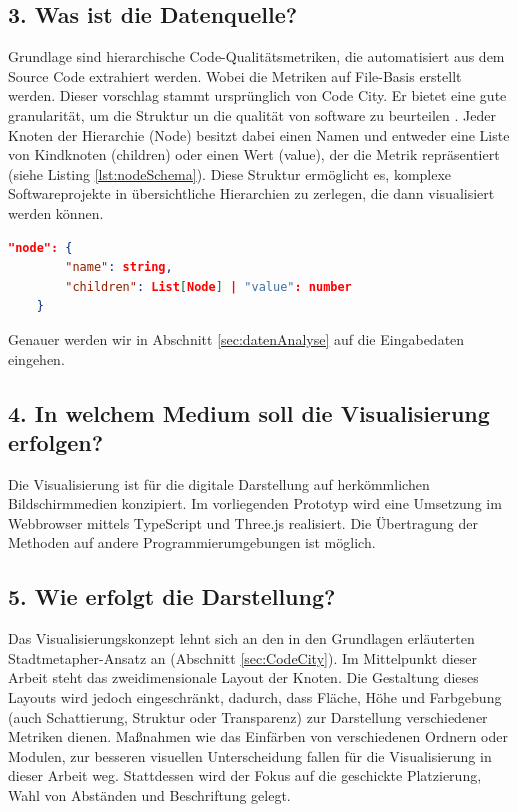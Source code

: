 \subsection*{3. Was ist die Datenquelle?}
Grundlage sind hierarchische Code-Qualitätsmetriken, die automatisiert aus dem Source Code extrahiert werden. Wobei die Metriken auf File-Basis erstellt werden. Dieser vorschlag stammt ursprünglich von Code City. Er bietet eine gute granularität, um die Struktur un die qualität von software zu beurteilen \cite{codeCity1}. Jeder Knoten der Hierarchie (Node) besitzt dabei einen Namen und entweder eine Liste von Kindknoten (children) oder einen Wert (value), der die Metrik repräsentiert (siehe Listing \ref{lst:nodeSchema}). 
Diese Struktur ermöglicht es, komplexe Softwareprojekte in übersichtliche Hierarchien zu zerlegen, die dann visualisiert werden können.

\begin{lstlisting}[language=json, caption={Schema einer Node}, label={lst:nodeSchema}]
    "node": {
        "name": string,
        "children": List[Node] | "value": number
    }
\end{lstlisting}

Genauer werden wir in Abschnitt \ref{sec:datenAnalyse} auf die Eingabedaten eingehen.

\subsection*{4. In welchem Medium soll die Visualisierung erfolgen?}
Die Visualisierung ist für die digitale Darstellung auf herkömmlichen Bildschirmmedien konzipiert. Im vorliegenden Prototyp wird eine Umsetzung im Webbrowser mittels TypeScript und Three.js realisiert. Die Übertragung der Methoden auf andere Programmierumgebungen ist möglich.

\subsection*{5. Wie erfolgt die Darstellung?}
Das Visualisierungskonzept lehnt sich an den in den Grundlagen erläuterten Stadtmetapher-Ansatz an (Abschnitt \ref{sec:CodeCity}). Im Mittelpunkt dieser Arbeit steht das zweidimensionale Layout der Knoten. Die Gestaltung dieses Layouts wird jedoch eingeschränkt, dadurch, dass Fläche, Höhe und Farbgebung (auch Schattierung, Struktur oder Transparenz) zur Darstellung verschiedener Metriken dienen. Maßnahmen wie das Einfärben von verschiedenen Ordnern oder Modulen, zur besseren visuellen Unterscheidung fallen für die Visualisierung in dieser Arbeit weg. Stattdessen wird der Fokus auf die geschickte Platzierung, Wahl von Abständen und Beschriftung gelegt. 

